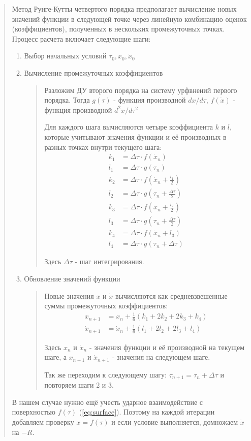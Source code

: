 \begin{quotation}
Метод Рунге-Кутты четвертого порядка предполагает вычисление новых значений функции в следующей точке через линейную комбинацию оценок (коэффициентов), полученных в нескольких промежуточных точках. Процесс расчета включает следующие шаги:

\begin{enumerate}
\item Выбор начальных условий $\tau_0, x_0, \dot x_0$
\item Вычисление промежуточных коэффициентов
\begin{quotation}
Разложим ДУ второго порядка на систему урфвнений первого порядка. Тогда $g(\tau)$ - функция производной $dx/d\tau$, \quad $f(\dot x)$ - функция производной $d^2x/d\tau^2$

Для каждого шага вычисляются четыре коэффициента \( k \) и \( l \), которые учитывают значения функции и её производных в разных точках внутри текущего шага:
\begin{align*}
k_1 &= \Delta \tau \cdot f(\dot x_n) \\
l_1 &= \Delta \tau \cdot g(\tau_n) \\
k_2 &= \Delta \tau \cdot f(\dot x_n + \frac{l_1}{2}) \\
l_2 &= \Delta \tau \cdot g(\tau_n + \frac{\Delta \tau }{2}) \\
k_3 &= \Delta \tau \cdot f(\dot x_n + \frac{l_2}{2}) \\
l_3 &= \Delta \tau \cdot g(\tau_n + \frac{\Delta \tau }{2}) \\
k_4 &= \Delta \tau \cdot f(\dot x_n + l_3) \\
l_4 &= \Delta \tau \cdot g(\tau_n + \Delta \tau)
\end{align*}

Здесь \(\Delta \tau\) - шаг интегрирования.
\end{quotation}

\item Обновление значений функции

\begin{quotation}
Новые значения \( x \) и \( \dot x \) вычисляются как средневзвешенные суммы промежуточных коэффициентов:
\begin{align*}
x_{n+1} &= x_n + \frac{1}{6} (k_1 + 2k_2 + 2k_3 + k_4) \\
\dot x_{n+1} &= \dot x_n + \frac{1}{6} (l_1 + 2l_2 + 2l_3 + l_4)
\end{align*}

Здесь \( x_n \) и \( \dot x_n \) - значения функции и её производной на текущем шаге, а \( x_{n+1} \) и \( \dot x_{n+1} \) - значения на следующем шаге.

Так же переходим к следующему шагу: $\tau_{n + 1} = \tau_n + \Delta \tau$ и повторяем шаги 2 и 3.
\end{quotation}
\end{enumerate}

В нашем случае нужно ещё учесть ударное взаимодействие с поверхностью $f(\tau)$ (\ref{eq:surface}). Поэтому на каждой итерации добавляем проверку $x = f(\tau)$ и если условие выполняется, домножаем \( \dot x \) на $-R$.
\end{quotation}